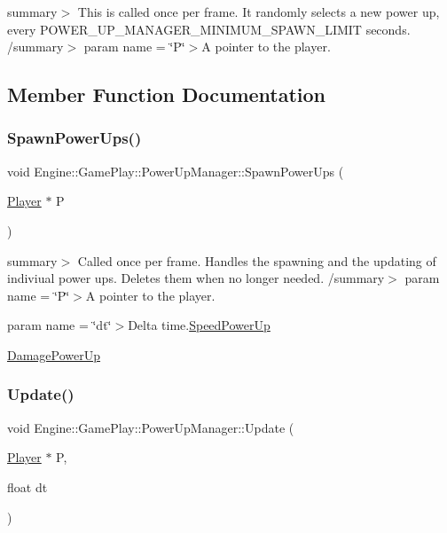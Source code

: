 summary$>$ This is called once per frame. It randomly selects a new power up, every P\+O\+W\+E\+R\+\_\+\+U\+P\+\_\+\+M\+A\+N\+A\+G\+E\+R\+\_\+\+M\+I\+N\+I\+M\+U\+M\+\_\+\+S\+P\+A\+W\+N\+\_\+\+L\+I\+M\+IT seconds. /summary$>$ param name = \char`\"{}\+P\char`\"{}$>$A pointer to the player.

\subsection{Member Function Documentation}
\mbox{\label{class_engine_1_1_game_play_1_1_power_up_manager_ae4b516c8145507da7d326ff7fa5fb2d5}} 
\subsubsection{\texorpdfstring{Spawn\+Power\+Ups()}{SpawnPowerUps()}}
{\footnotesize\ttfamily void Engine\+::\+Game\+Play\+::\+Power\+Up\+Manager\+::\+Spawn\+Power\+Ups (\begin{DoxyParamCaption}\item[{\hyperlink{class_engine_1_1_game_play_1_1_player}{Player} $\ast$}]{P }\end{DoxyParamCaption})}

summary$>$ Called once per frame. Handles the spawning and the updating of indiviual power ups. Deletes them when no longer needed. /summary$>$ param name = \char`\"{}\+P\char`\"{}$>$A pointer to the player.

param name = \char`\"{}dt\char`\"{}$>$Delta time.\hyperlink{class_engine_1_1_game_play_1_1_speed_power_up}{Speed\+Power\+Up}

\hyperlink{class_engine_1_1_game_play_1_1_damage_power_up}{Damage\+Power\+Up} \mbox{\label{class_engine_1_1_game_play_1_1_power_up_manager_a1a14fd48c2687e5e3fe3df6c7415dad8}} 
\subsubsection{\texorpdfstring{Update()}{Update()}}
{\footnotesize\ttfamily void Engine\+::\+Game\+Play\+::\+Power\+Up\+Manager\+::\+Update (\begin{DoxyParamCaption}\item[{\hyperlink{class_engine_1_1_game_play_1_1_player}{Player} $\ast$}]{P,  }\item[{float}]{dt }\end{DoxyParamCaption})}

